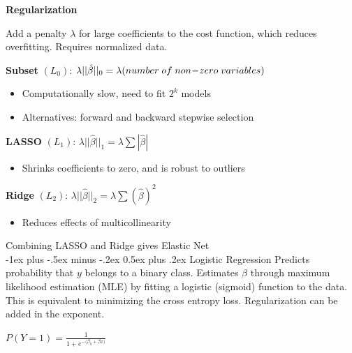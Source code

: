 \documentclass[10pt,landscape]{article}
\makeatletter
\renewcommand{\section}{\@startsection{section}{1}{0mm}%
                                {-1ex plus -.5ex minus -.2ex}%
                                {0.5ex plus .2ex}%
                                {\normalfont\large\bfseries}}
\makeatother
\begin{document}
\begin{multicols}{3}
    \textbf{Regularization}

    Add a penalty $\lambda$ for large coefficients to the cost function, which reduces overfitting. Requires normalized data.

    \textbf{Subset}  $(L_0)$: $\lambda ||\hat{\beta}||_0 = \lambda (number \;of\;non\hspace{-.7mm}-\hspace{-.7mm}zero\; variables)$
    \begin{itemize}[label={--},leftmargin=4mm]
        \vspace{-1mm}
        \itemsep -.4mm
        \item Computationally slow, need to fit $2^k$ models
        \item Alternatives: forward and backward stepwise selection
    \end{itemize}
    \textbf{LASSO} $(L_1)$: $\lambda ||\hat{\beta}||_1 = \lambda\sum | \hat{\beta} |$
    \begin{itemize}[label={--},leftmargin=4mm]
        \vspace{-1mm}
        \itemsep -.4mm
        \item Shrinks coefficients to zero, and is robust to outliers
    \end{itemize}
    \textbf{Ridge}  $(L_2)$: $\lambda ||\hat{\beta}||_2 = \lambda\sum( \hat{\beta})^2$
    \begin{itemize}[label={--},leftmargin=4mm]
        \vspace{-1mm}
        \itemsep -.4mm
        \item Reduces effects of multicollinearity
    \end{itemize}
    Combining LASSO and Ridge gives Elastic Net\\

    \section{Logistic Regression}
    Predicts probability that $y$ belongs to a binary class. Estimates $\beta$ through maximum likelihood estimation (MLE) by fitting a logistic (sigmoid) function to the data. This is equivalent to minimizing the cross entropy loss. Regularization can be added in the exponent.
    \vspace{-3mm}
    \begin{center}
        $\displaystyle P(Y=1) = \frac{1}{1 + e^{-({\beta_0} + {\beta x)}}}$


\end{center}
\end{multicols}
\end{document}

